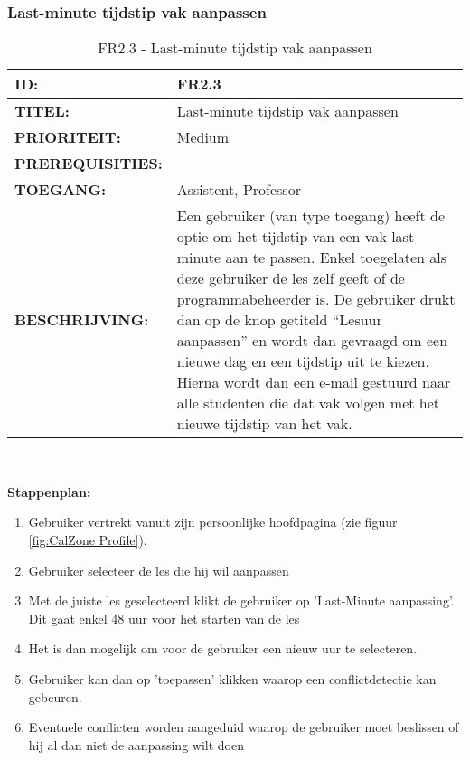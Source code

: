 \subsubsection{Last-minute tijdstip vak aanpassen} 
\noindent\begin{table}[H]
            \begin{tabular}{l | p{10cm}}
                \textbf{ID:} & FR2.3 \\ \hline
                \textbf{TITEL:} & Last-minute tijdstip vak aanpassen\\ \hline
                \textbf{PRIORITEIT:} &  Medium \\ \hline
                \textbf{PREREQUISITIES:} & \\ \hline
                \textbf{TOEGANG:} & Assistent, Professor \\ \hline
                \textbf{BESCHRIJVING:} & Een gebruiker (van type toegang) heeft de optie om het tijdstip van een vak last-minute aan te passen. Enkel toegelaten als deze gebruiker de les zelf geeft of de programmabeheerder is.  De gebruiker drukt dan op de knop getiteld “Lesuur aanpassen” en wordt dan gevraagd om een nieuwe dag en een tijdstip uit te kiezen. 
                                        Hierna wordt dan een e-mail gestuurd naar alle studenten die dat vak volgen met het nieuwe tijdstip van het vak.\\ 
            \end{tabular}\\
            \caption{FR2.3 - Last-minute tijdstip vak aanpassen}
            \label{tab:FR2.3 - Last-minute tijdstip vak aanpassen}
        \end{table}
       
\textbf{Stappenplan:}
	\begin{enumerate}
	\item Gebruiker vertrekt vanuit zijn persoonlijke hoofdpagina (zie figuur \ref{fig:CalZone Profile}).
	\item Gebruiker selecteer de les die hij wil aanpassen
	\item Met de juiste les geselecteerd klikt de gebruiker op 'Last-Minute aanpassing'. Dit gaat enkel 48 uur voor het starten van de les
	\item Het is dan mogelijk om voor de gebruiker een nieuw uur te selecteren.
	\item Gebruiker kan dan op 'toepassen' klikken waarop een conflictdetectie kan gebeuren.
	\item Eventuele conflicten worden aangeduid waarop de gebruiker moet beslissen of hij al dan niet de aanpassing wilt doen
	\end{enumerate}
        
